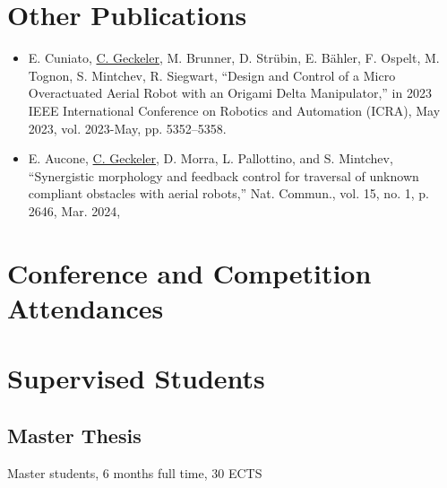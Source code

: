 \section{Other Publications}

\begin{itemize}
    \item \cite{Cuniato2023} E. Cuniato, \underline{C. Geckeler}, M. Brunner, D. Strübin, E. Bähler, F. Ospelt, M. Tognon, S. Mintchev, R. Siegwart, “Design and Control of a Micro Overactuated Aerial Robot with an Origami Delta Manipulator,” in 2023 IEEE International Conference on Robotics and Automation (ICRA), May 2023, vol. 2023-May, pp. 5352–5358.
    \item \cite{Aucone2024} E. Aucone, \underline{C. Geckeler}, D. Morra, L. Pallottino, and S. Mintchev, “Synergistic morphology and feedback control for traversal of unknown compliant obstacles with aerial robots,” Nat. Commun., vol. 15, no. 1, p. 2646, Mar. 2024,
\end{itemize}


\section{Conference and Competition Attendances}


\section{Supervised Students}

\subsection{Master Thesis}
Master students, 6 months full time, 30 ECTS


